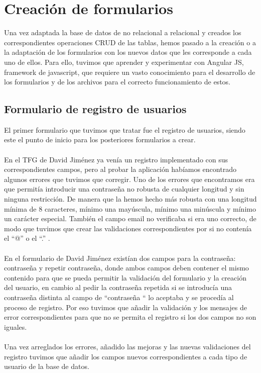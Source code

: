 \documentclass[11pt]{book}
\begin{document}
\chapter{Creación de formularios}\label{cap:formularios}
Una vez adaptada la base de datos de no relacional a relacional y creados los correspondientes operaciones CRUD de las tablas, hemos pasado a la creación o a la adaptación de los formularios con los nuevos datos que les corresponde a cada uno de ellos. Para ello, tuvimos que aprender y experimentar con Angular JS, framework de javascript, que requiere un vasto conocimiento para el desarrollo de los formularios y de los archivos para el correcto funcionamiento de estos. 
\section{Formulario de registro de usuarios}
El primer formulario que tuvimos que tratar fue el registro de usuarios, siendo este el punto de inicio para los posteriores formularios a crear.\\\\
En el TFG de David Jiménez ya venía un registro implementado con sus correspondientes campos, pero al probar la aplicación habíamos encontrado algunos errores que tuvimos que corregir. Uno de los errores que encontramos era que permitía introducir una contraseña no robusta de cualquier longitud y sin ninguna restricción. De manera que la hemos hecho más robusta con una longitud mínima de 8 caracteres, mínimo una mayúscula, mínimo una minúscula y mínimo un carácter especial. También el campo email no verificaba si era uno  correcto, de modo que tuvimos que crear las validaciones correspondientes por si no contenía el “@” o el “.” .\\\\
En el formulario de David Jiménez existían dos campos para la contraseña: contraseña y repetir contraseña, donde ambos campos deben contener el mismo contenido para que se pueda permitir la validación del formulario y la creación del usuario, en cambio al pedir la contraseña repetida si se introducía una contraseña distinta al campo de “contraseña “ lo aceptaba y se procedía al proceso de registro. Por eso tuvimos que añadir la validación y los mensajes de error correspondientes para que no se permita el registro si los dos campos no son iguales.\\\\
Una vez arreglados los errores, añadido las mejoras y las nuevas validaciones del registro tuvimos que añadir los campos nuevos correspondientes a cada tipo de usuario de la base de datos. \\\\
\end{document}
